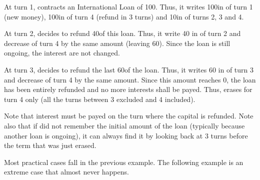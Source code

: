 \begin{exemple}
  At turn 1, \FRA contracts an International Loan of 100\ducats. Thus, it
  writes 100\ducats in  of turn 1 (new
  money), 100\ducats in  of turn 4
  (refund in 3 turns) and 10\ducats in  of turns 2, 3 and 4.

  At turn 2, \FRA decides to refund 40\ducats of this loan. Thus, it write 40
  in  of turn 2 and decrease
   of turn 4 by the same amount
  (leaving 60). Since the loan is still ongoing, the interest are not changed.

  At turn 3, \FRA decides to refund the last 60\ducats of the loan. Thus, it
  writes 60 in  of turn 3 and
  decrease  of turn 4 by the same
  amount. Since this amount reaches 0\ducats, the loan has been entirely
  refunded and no more interests shall be payed. Thus, \FRA erases
   for turn 4 only (all the turns
  between 3 excluded and 4 included).

  Note that interest must be payed on the turn where the capital is
  refunded. Note also that if \FRA did not remember the initial amount of the
  loan (typically because another loan is ongoing), it can always find it by
  looking back at  3 turns before the
  term that was just erased.
\end{exemple}

\begin{designnote}
  Most practical cases fall in the previous example. The following example is
  an extreme case that almost never happens.
\end{designnote}

